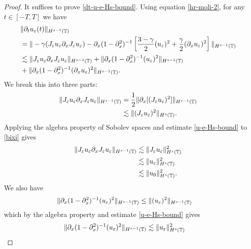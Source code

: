 %
%
\begin{proof} It suffices to prove  \eqref{dt-u-e-Hs-bound}.
Using equation \eqref{hr-moli-2}, for any $t\in [-T, T]$ we have
%
\begin{equation*}
\begin{split}
& \| \partial_t u_\varepsilon(t) \|_{H^{s-1}(\mathbb{T})}  
\\
& = 
\| -\gamma (J_\varepsilon u_\varepsilon \partial_x  J_\varepsilon  u_\varepsilon) -
\partial_x (1-\partial_x^2)^{-1} \left [\frac{3-\gamma}{2} (u_\varepsilon)^2 +
\frac{\gamma}{2}(\partial_x u_\varepsilon)^2 \right ] \|_{H^{s-1}(\mathbb{T})}
\\
& \lesssim  
\| J_\varepsilon u_\varepsilon \partial_x  J_\varepsilon  u_\varepsilon \|_{H^{s-1}(\mathbb{T})}
+ \|\partial_x (1-\partial_x^2)^{-1} (u_\varepsilon)^2 \|_{H^{s-1}(\mathbb{T})}
\\
& + \| \partial_x (1-\partial_x^2)^{-1}(\partial_x u_\varepsilon)^2\|_{H^{s-1}(\mathbb{T})}.
\end{split}
\end{equation*}
We break this into three parts:
\begin{equation}
\label{bixi}
\begin{split}
\| J_\varepsilon u_\varepsilon \partial_x J_\varepsilon u_\varepsilon \|_{H^{s-1}(\mathbb{T})}
& = 
\frac{1}{2}\|\partial_x[(J_\varepsilon u_\varepsilon
)^2]\|_{H^{s-1}(\mathbb{T})}
\\
& \lesssim \|(J_\varepsilon u_\varepsilon )^2\|_{H^s(\mathbb{T})}.
\end{split}
\end{equation}
Applying the algebra property of Sobolev spaces and estimate
\eqref{u-e-Hs-bound} to \eqref{bixi} gives 
%
\begin{equation}
\label{deriv1}
\begin{split}
\|J_\varepsilon u_\varepsilon \partial_x J_\varepsilon u_\varepsilon  
\|_{H^{s-1}(\mathbb{T})}
& \lesssim
\|J_\varepsilon u_\varepsilon \|_{H^s(\mathbb{T})}^2
\\
&\lesssim
\| u_\varepsilon \|_{H^s(\mathbb{T})}^2
\\
&\lesssim
\|u_0\|_{H^s(\mathbb{T})}^2.
\end{split}
\end{equation}
We also have
\begin{equation*}
\begin{split}
\|\partial_x (1-\partial_x^2)^{-1} (u_\varepsilon)^2\|_{H^{s-1}(\mathbb{T})}
& \le \| (u_\varepsilon)^2\|_{H^{s-1}(\mathbb{T})}
\end{split}
\end{equation*}
which by the algebra property and estimate \eqref{u-e-Hs-bound}
gives
\begin{equation}
\begin{split}
\label{deriv2}
\|\p_x (1-\p_x^2)^{-1} (u_\ee)^2\|_{H^{s-1}(\ci)}
& \lesssim \|u_\ee\|^2_{H^s(\ci)} 

\end{split}
\end{equation}
\end{proof}
